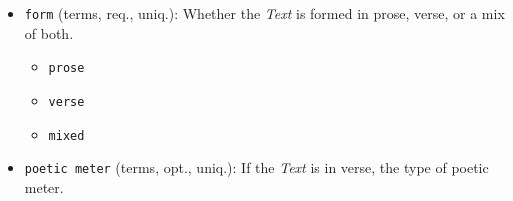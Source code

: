 \begin{itemize}
\begin{multicols}{2}
\begin{itemize}
            \item \texttt{fro\_PRO}: Franco-Occitan
            \item \texttt{ghg}: Hiberno-Scottish Gaelic, Early Modern Irish
            \item \texttt{glg}: Galician
            \item \href{https://www.wikidata.org/wiki/Q1072111}{\texttt{glg\_POR}}: Galician-Portugese
            \item \texttt{gmh}: Middle High German (ca. 1050-1500)
            \item \texttt{gml}: Middle Low German
            \item \texttt{isl}: Islandic
            \item \texttt{ita}: Italian
            \item \texttt{mga}: Middle Irish (900-1200)
            \item \texttt{non}: Old Norse
            \item \href{https://www.wikidata.org/wiki/Q12330003}{\texttt{non\_DAN}}: Old East Norse, Old Danish (800-1100)
            \item \href{https://www.wikidata.org/wiki/Q2417210}{\texttt{non\_SWE}}: Old Swedish (800-1500)
            \item \texttt{oco}: Old Cornish
            \item \texttt{por}: Portugese
            \item \texttt{pro}: Old Occitan, Old Provençal (to 1500)
            \item \texttt{spa}: Spanish or Castilian
            \item \texttt{wlm}: Middle Welsh
        \end{itemize}
    \end{multicols}
    \item \texttt{form} (terms, req., uniq.): Whether the \textit{Text} is formed in prose, verse, or a mix of both.
    \begin{multicols}{4}
        \begin{itemize}
            \item \texttt{prose}
            \item \texttt{verse}
            \item \texttt{mixed}
        \end{itemize}
    \end{multicols}
    \item \texttt{poetic meter} (terms, opt., uniq.): If the \textit{Text} is in verse, the type of poetic meter.

\end{itemize}
